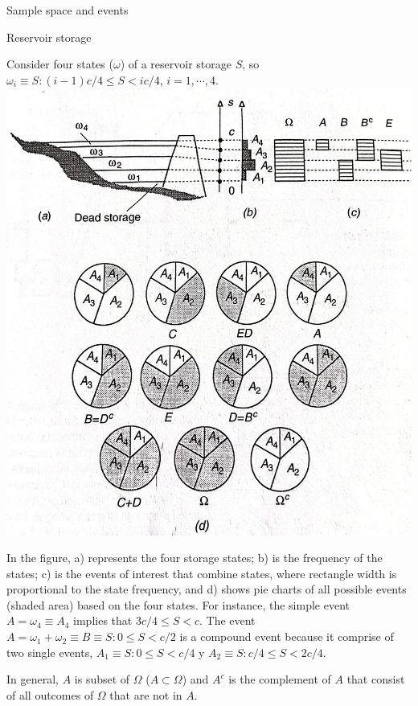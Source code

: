 \documentclass[8pt]{beamer}
\begin{document}
\begin{frame}{Sample space and events}
    \begin{exampleblock}{Reservoir storage}

    \begin{minipage}{0.59\textwidth}
        Consider four states ($\omega$) of a reservoir storage $S$, so $\omega_i \equiv {S: (i-1)c/4 \leq S < ic/4}$, $i = 1, \cdots, 4$.
        \includegraphics[width=\textwidth]{fi212.jpeg}
    \end{minipage}
    \hfill
    \begin{minipage}{0.39\textwidth}
        In the figure, a) represents the four storage states; b) is the frequency of the states; c) is the events of interest that combine states, where rectangle width is proportional to the state frequency, and d) shows pie charts of all possible events (shaded area) based on the four states. For instance, the simple event $A = \omega_4 \equiv A_4$ implies that $3c/4 \leq S < c$. The event $A = \omega_1 + \omega_2 \equiv B \equiv {S: 0 \leq S < c/2}$ is a compound event because it comprise of two single events, $A_1 \equiv {S: 0 \leq S < c/4}$ y $A_2 \equiv {S: c/4 \leq S < 2c/4}$.
    \end{minipage}
    \end{exampleblock}
    In general, $A$ is subset of $\Omega$ ($A \subset \Omega$) and $A^c$ is the complement of $A$ that consist of all outcomes of $\Omega$ that are not in $A$.
 
\end{frame}
\end{document}
